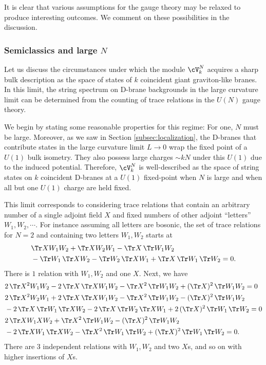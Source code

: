 \documentclass[a4paper,12pt]{article}
\begin{document}
It is clear that various assumptions for the gauge theory may be relaxed to produce interesting outcomes. We comment on these possibilities in the discussion.


\subsubsection{Semiclassics and large $N$} \label{subsubsec:largeN}

Let us discuss the circumstances under which the module $\cV_k^N$ acquires a sharp bulk description as the space of states of $k$ coincident giant graviton-like branes. In this limit, the string spectrum on D-brane backgrounds in the large curvature limit can be determined from the counting of trace relations in the $U(N)$ gauge theory.

We begin by stating some reasonable properties for this regime: For one, $N$ must be large. Moreover, as we saw in Section \ref{subsec:localization}, the D-branes that contribute states in the large curvature limit $L \to 0$ wrap the fixed point of a $U(1)$ bulk isometry. They also possess large charges $\sim k N$ under this $U(1)$ due to the induced potential. Therefore, $\cV_k^N$ is well-described as the space of string states on $k$ coincident D-branes at a $U(1)$ fixed-point when $N$ is large and when all but one $U(1)$ charge are held fixed.

This limit corresponds to considering trace relations that contain an arbitrary number of a single adjoint field $X$ and fixed numbers of other adjoint ``letters'' $W_1, W_2, \cdots$. For instance assuming all letters are bosonic, the set of trace relations for $N=2$ and containing two letters $W_1, W_2$ starts at
\begin{align}
    &\Tr X W_1 W_2 + \Tr X W_2 W_1  - \Tr X \, \Tr W_1 W_2 \nonumber  \\
    &- \Tr W_1\, \Tr X W_2 - \Tr W_2\, \Tr X W_1  + \Tr X\, \Tr W_1\, \Tr W_2 = 0.
\end{align}
There is $1$ relation with $W_1, W_2$ and one $X$. Next, we have
\begin{align}
    &2\, \Tr X^2 W_1 W_2 - 2\, \Tr X\, \Tr X W_1 W_2 - \Tr X^2\, \Tr W_1 W_2 + (\Tr X)^2\, \Tr W_1 W_2 = 0 \nonumber \\
    &2\, \Tr X^2 W_2 W_1 + 2\, \Tr X\, \Tr X W_1 W_2 - \Tr X^2\, \Tr W_1 W_2 - (\Tr X)^2\, \Tr W_1 W_2 \nonumber \\
    &- 2\, \Tr X\, \Tr W_1\, \Tr X W_2 - 2\, \Tr X\, \Tr W_2\, \Tr X W_1 + 2\, (\Tr X)^2\, \Tr W_1\, \Tr W_2 = 0 \nonumber \\
    &2\, \Tr X W_1 X W_2 + \Tr X^2\, \Tr W_1 W_2 - (\Tr X)^2\, \Tr W_1 W_2 \nonumber \\
    &- 2\, \Tr X W_1\, \Tr X W_2- \Tr X^2\, \Tr W_1\, \Tr W_2 + (\Tr X)^2\, \Tr W_1\, \Tr W_2 = 0.
\end{align}
There are $3$ independent relations with $W_1, W_2$ and two $X$s, and so on with higher insertions of $X$s. 
\end{document}

